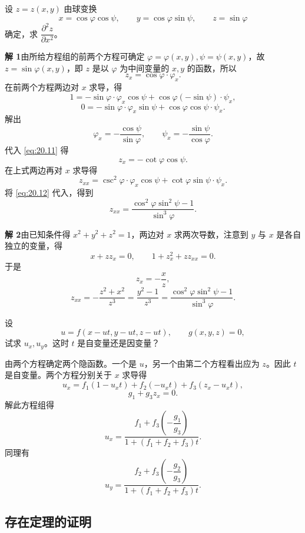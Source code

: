 \begin{xexample}[20.2.3]
设 $z=z(x,y)$ 由球变换
\[
  x=\cos\varphi\cos\psi,\qquad
  y=\cos\varphi\sin\psi,\qquad
  z=\sin\varphi
\]
确定，求 $\dfrac{\partial^2z}{\partial x^2}$。
\end{xexample}
\begin{xsolution}
\textbf{解 1}\quad 由所给方程组的前两个方程可确定 $\varphi=\varphi(x,y),\psi=\psi(x,y)$，故 $z=\sin\varphi(x,y)$，即 $z$ 是以 $\varphi$ 为中间变量的 $x,y$ 的函数，所以
\begin{equation}
  z_x=\cos\varphi\cdot\varphi_x.
  \tag{20.11}
  \label{eq:20.11}
\end{equation}
在前两个方程两边对 $x$ 求导，得
\[
  1=-\sin\varphi\cdot\varphi_x\cos\psi+\cos\varphi(-\sin\psi)\cdot\psi_x,
\]
\[
  0=-\sin\varphi\cdot\varphi_x\sin\psi+\cos\varphi\cos\psi\cdot\psi_x.
\]
解出
\begin{equation}
  \varphi_x=-\frac{\cos\psi}{\sin\varphi},
  \qquad
  \psi_x=-\frac{\sin\psi}{\cos\varphi}.
  \tag{20.12}
  \label{eq:20.12}
\end{equation}
代入 \eqref{eq:20.11} 得
\[
  z_x=-\cot\varphi\cos\psi.
\]
在上式两边再对 $x$ 求导得
\[
  z_{xx}=\csc^2\varphi\cdot\varphi_x\cos\psi
  +\cot\varphi\sin\psi\cdot\psi_x.
\]
将 \eqref{eq:20.12} 代入，得到
\[
  z_{xx}=\frac{\cos^2\varphi\sin^2\psi-1}{\sin^3\varphi}.
\]

\textbf{解 2}\quad 由已知条件得 $x^2+y^2+z^2=1$，两边对 $x$ 求两次导数，注意到 $y$ 与 $x$ 是各自独立的变量，得
\[
  x+zz_x=0,\qquad 1+z_x^2+zz_{xx}=0.
\]
于是
\[
  z_x=-\frac{x}{z},
\]
\[
  z_{xx}=-\frac{z^2+x^2}{z^3}
  =\frac{y^2-1}{z^3}
  =\frac{\cos^2\varphi\sin^2\psi-1}{\sin^3\varphi}.
\]
\end{xsolution}

\begin{xexample}[20.2.4]
设
\[
  u=f(x-ut,y-ut,z-ut),\qquad g(x,y,z)=0,
\]
试求 $u_x,u_y$。这时 $t$ 是自变量还是因变量？
\end{xexample}
\begin{xsolution}
由两个方程确定两个隐函数。一个是 $u$，另一个由第二个方程看出应为 $z$。因此 $t$ 是自变量。两个方程分别关于 $x$ 求导得
\[
  u_x=f_1(1-u_xt)+f_2(-u_xt)+f_3(z_x-u_xt),
\]
\[
  g_1+g_3z_x=0.
\]
解此方程组得
\[
  u_x=\frac{f_1+f_3\left(-\dfrac{g_1}{g_3}\right)}{1+(f_1+f_2+f_3)t}.
\]
同理有
\[
  u_y=\frac{f_2+f_3\left(-\dfrac{g_2}{g_3}\right)}{1+(f_1+f_2+f_3)t}.
\]
\end{xsolution}

\subsection{存在定理的证明}

